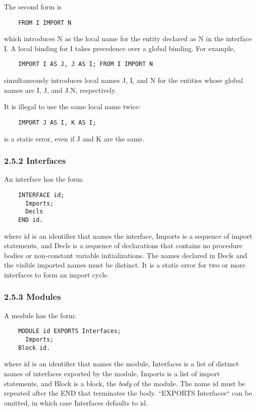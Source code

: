 \documentclass[10pt]{article}
\begin{document}
 The second form is 
\begin{verbatim}
    FROM I IMPORT N
\end{verbatim}
 which introduces N as the local name for the entity declared as N in the interface I. A local binding for I takes precedence over a global binding. For example, 
\begin{verbatim}
    IMPORT I AS J, J AS I; FROM I IMPORT N
\end{verbatim}
 simultaneously introduces local names J, I, and N for the entities whose global names are I, J, and J.N, respectively. 


  It is illegal to use the same local name twice: 
\begin{verbatim}
    IMPORT J AS I, K AS I;
\end{verbatim}
 is a static error, even if J and K are the same. 


 
\subsubsection*{2.5.2 Interfaces}


  An interface has the form: 
\begin{verbatim}
    INTERFACE id;
      Imports;
      Decls
    END id.
\end{verbatim}
 where id is an identifier that names the interface,  Imports is a sequence of import statements, and Decls is a sequence of declarations that contains no procedure bodies or non-constant variable initializations. The names declared in  Decls and the visible imported names must be distinct. It is a static error for two or more interfaces to form an import cycle. 


 
\subsubsection*{2.5.3 Modules}


  A module has the form: 
\begin{verbatim}
    MODULE id EXPORTS Interfaces;
      Imports;
    Block id.
\end{verbatim}
 where id is an identifier that names the module, Interfaces is a list of distinct names of interfaces exported by the module, Imports is a list of import statements, and Block is a block, the \emph{body}
 of the module. The name id must be repeated after the END that terminates the body. ``EXPORTS Interfaces`` can be omitted, in which case Interfaces defaults to id. 
\end{document}
